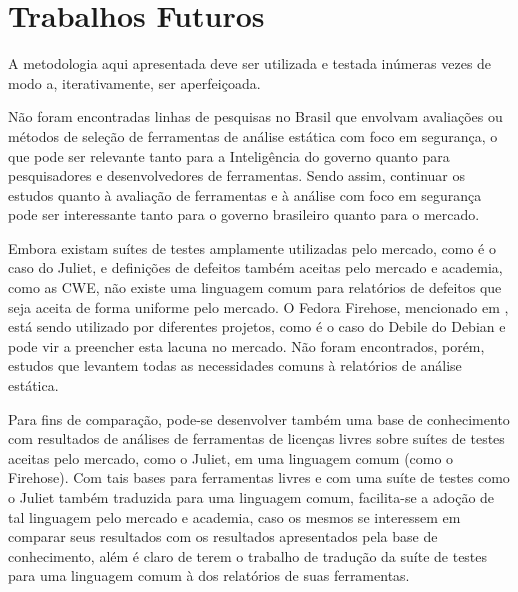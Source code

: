 \section*{Trabalhos Futuros}

A metodologia aqui apresentada deve ser utilizada e testada inúmeras vezes de modo a, iterativamente, ser aperfeiçoada.

Não foram encontradas linhas de pesquisas no Brasil que envolvam avaliações ou métodos de seleção de ferramentas de análise estática com foco em segurança, o que pode ser relevante tanto para a Inteligência do governo quanto para pesquisadores e desenvolvedores de ferramentas. Sendo assim, continuar os estudos quanto à avaliação de ferramentas e à análise com foco em segurança pode ser interessante tanto para o governo brasileiro quanto para o mercado.

Embora existam suítes de testes amplamente utilizadas pelo mercado, como é o caso do Juliet, e definições de defeitos também aceitas pelo mercado e academia, como as CWE, não existe uma linguagem comum para relatórios de defeitos que seja aceita de forma uniforme pelo mercado. O Fedora Firehose, mencionado em , está sendo utilizado por diferentes projetos, como é o caso do Debile do Debian e pode vir a preencher esta lacuna no mercado. Não foram encontrados, porém, estudos que levantem todas as necessidades comuns à relatórios de análise estática.

Para fins de comparação, pode-se desenvolver também uma base de conhecimento com resultados de análises de  ferramentas de licenças livres sobre suítes de testes aceitas pelo mercado, como o Juliet, em uma linguagem comum (como o Firehose). Com tais bases para ferramentas livres e com uma suíte de testes como o Juliet também traduzida para uma linguagem comum, facilita-se a adoção de tal linguagem pelo mercado e academia, caso os mesmos se interessem em comparar seus resultados com os resultados apresentados pela base de conhecimento, além é claro de terem o trabalho de tradução da suíte de testes para uma linguagem comum à dos relatórios de suas ferramentas.

